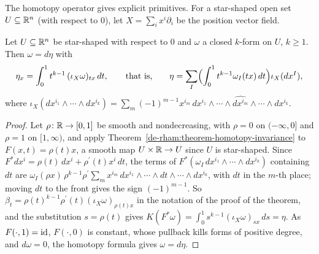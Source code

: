 The homotopy operator gives explicit primitives. For a star-shaped open set $U \subseteq \mathbb{R}^n$ (with respect to $0$), let $X = \sum_ix^i\partial_i$ be the position vector
field.

\begin{corollary}\label{de-rham:corollary-explicit-poincare}
Let $U \subseteq \mathbb{R}^n$ be star-shaped with respect to $0$ and $\omega$ a closed $k$-form on $U$, $k \geq 1$. Then $\omega = d\eta$ with
\[
\eta_x = \int_0^1t^{k-1}\,(\iota_X\omega)_{tx}\,dt, \qquad\text{that is,}\qquad \eta = \sum_I\Bigl(\int_0^1t^{k-1}\omega_I(tx)\,dt\Bigr)\iota_X(dx^I),
\]
where $\iota_X(dx^{i_1} \wedge \cdots \wedge dx^{i_k}) = \sum_m(-1)^{m-1}x^{i_m}\,dx^{i_1} \wedge \cdots \wedge \widehat{dx^{i_m}} \wedge \cdots \wedge dx^{i_k}$.
\end{corollary}

\begin{proof}
Let $\rho \colon \mathbb{R} \to [0, 1]$ be smooth and nondecreasing, with $\rho = 0$ on $(-\infty, 0]$ and $\rho = 1$ on $[1, \infty)$, and apply
Theorem~\ref{de-rham:theorem-homotopy-invariance} to $F(x, t) = \rho(t)x$, a smooth map $U \times \mathbb{R} \to U$ since $U$ is star-shaped. Since
$F^*dx^i = \rho(t)\,dx^i + \rho^{\prime}(t)x^i\,dt$, the terms of $F^*(\omega_I\,dx^{i_1} \wedge \cdots \wedge dx^{i_k})$ containing $dt$ are
$\omega_I(\rho x)\,\rho^{k-1}\rho^{\prime}\sum_m x^{i_m}\,dx^{i_1} \wedge \cdots \wedge dt \wedge \cdots \wedge dx^{i_k}$, with $dt$ in the $m$-th place; moving $dt$ to the front gives the sign
$(-1)^{m-1}$. So $\beta_t = \rho(t)^{k-1}\rho^{\prime}(t)(\iota_X\omega)_{\rho(t)x}$ in the notation of the proof of the theorem, and the substitution $s = \rho(t)$ gives
$K(F^*\omega) = \int_0^1s^{k-1}(\iota_X\omega)_{sx}\,ds = \eta$. As $F(\cdot, 1) = \mathrm{id}$, $F(\cdot, 0)$ is constant, whose pullback kills forms of positive degree, and $d\omega = 0$, the
homotopy formula gives $\omega = d\eta$.
\end{proof}

